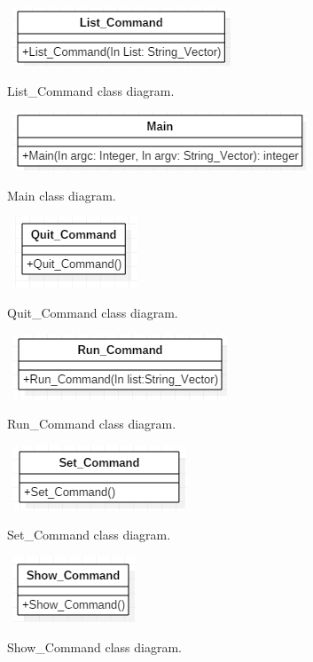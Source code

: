 \documentclass{report}
\begin{document}
\begin{figure}[!ht]
  	\centering
	\
    \includegraphics[scale=0.90]{List_Command.png}
  \caption{List\_Command class diagram.}
\end{figure}

\begin{figure}[!ht]
  	\centering
	\
    \includegraphics[scale=0.90]{Main.png}
  \caption{Main class diagram.}
\end{figure}

\begin{figure}[!ht]
  	\centering
	\
    \includegraphics[scale=0.90]{Quit_Command.png}
  \caption{Quit\_Command class diagram.}
\end{figure}

\clearpage

\begin{figure}[!ht]
  	\centering
	\
    \includegraphics[scale=0.90]{Run_Command.png}
  \caption{Run\_Command class diagram.}
\end{figure}

\begin{figure}[!ht]
  	\centering
	\
    \includegraphics[scale=0.90]{Set_Command.png}
  \caption{Set\_Command class diagram.}
\end{figure}

\begin{figure}[!ht]
  	\centering
	\
    \includegraphics[scale=0.90]{Show_Command.png}
  \caption{Show\_Command class diagram.}
\end{figure}
\end{document}
